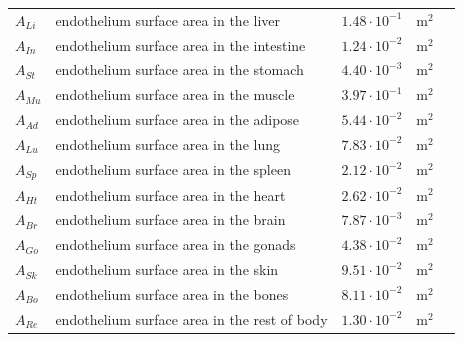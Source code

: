 \documentclass[preprint,12pt,authoryear]{elsarticle}
\begin{document}
\begin{longtable}{P{2cm}P{3.5cm}P{2cm}P{1cm}P{2.5cm}}
$A_{Li}$ & endothelium surface area in the liver  & $1.48 \cdot 10^{-1}$ & $\text{m}^2$ & \citep{willmann_2003} \\
$A_{In}$ & endothelium surface area in the intestine & $1.24 \cdot 10^{-2}$ & $\text{m}^2$ & \citep{willmann_2003}  \\
$A_{St}$ & endothelium surface area in the stomach & $4.40 \cdot 10^{-3}$ & $\text{m}^2$ & \citep{willmann_2003}  \\
$A_{Mu}$ & endothelium surface area in the muscle & $3.97 \cdot 10^{-1}$ & $\text{m}^2$ & \citep{willmann_2003}  \\
$A_{Ad}$ & endothelium surface area in the adipose & $5.44 \cdot 10^{-2}$ & $\text{m}^2$ & \citep{willmann_2003}  \\
$A_{Lu}$ & endothelium surface area in the lung & $7.83 \cdot 10^{-2}$ & $\text{m}^2$ & \citep{willmann_2003}  \\
$A_{Sp}$ & endothelium surface area in the spleen & $2.12 \cdot 10^{-2}$ & $\text{m}^2$ & \citep{willmann_2003}  \\
$A_{Ht}$ & endothelium surface area in the heart & $2.62 \cdot 10^{-2}$ & $\text{m}^2$ & \citep{willmann_2003}  \\
$A_{Br}$ & endothelium surface area in the brain & $7.87 \cdot 10^{-3}$ & $\text{m}^2$ & \citep{willmann_2003}  \\
$A_{Go}$ & endothelium surface area in the gonads & $4.38 \cdot 10^{-2}$ & $\text{m}^2$ & \citep{willmann_2003}  \\
$A_{Sk}$ & endothelium surface area in the skin & $9.51 \cdot 10^{-2}$ & $\text{m}^2$ & \citep{willmann_2003}  \\
$A_{Bo}$ & endothelium surface area in the bones & $8.11 \cdot 10^{-2}$ & $\text{m}^2$ & \citep{willmann_2003}  \\
$A_{Re}$ & endothelium surface area in the rest of body & $1.30 \cdot 10^{-2}$ & $\text{m}^2$ & \citep{willmann_2003}  \\
\midrule\midrule


\end{longtable}
\end{document}
